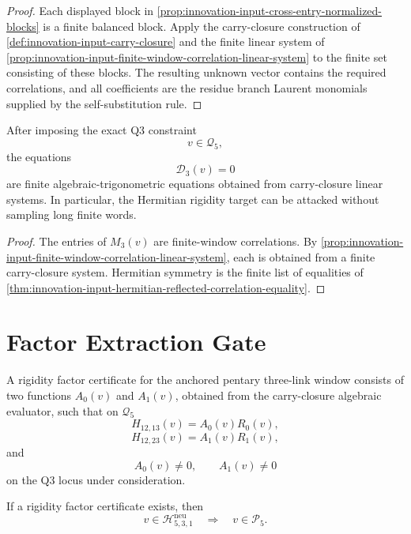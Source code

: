\begin{proof}
Each displayed block in
\autoref{prop:innovation-input-cross-entry-normalized-blocks} is a finite
balanced block. Apply the carry-closure construction of
\autoref{def:innovation-input-carry-closure} and the finite linear system
of
\autoref{prop:innovation-input-finite-window-correlation-linear-system}
to the finite set consisting of these blocks. The resulting unknown vector
contains the required correlations, and all coefficients are the residue
branch Laurent monomials supplied by the self-substitution rule.
\end{proof}

\begin{corollary}
\label{cor:innovation-input-hermitian-locus-explicit}
After imposing the exact Q3 constraint
$$
v\in\mathcal Q_5,
$$
the equations
$$
\mathcal D_3(v)=0
$$
are finite algebraic-trigonometric equations obtained from carry-closure
linear systems. In particular, the Hermitian rigidity target can be
attacked without sampling long finite words.
\end{corollary}

\begin{proof}
The entries of $M_3(v)$ are finite-window correlations. By
\autoref{prop:innovation-input-finite-window-correlation-linear-system},
each is obtained from a finite carry-closure system. Hermitian symmetry is
the finite list of equalities of
\autoref{thm:innovation-input-hermitian-reflected-correlation-equality}.
\end{proof}

\section{Factor Extraction Gate}
\label{sec:innovation-input-factor-extraction-gate}

\begin{definition}
\label{def:innovation-input-rigidity-factor-certificate}
A rigidity factor certificate for the anchored pentary three-link window
consists of two functions $A_0(v)$ and $A_1(v)$, obtained from the
carry-closure algebraic evaluator, such that on $\mathcal Q_5$
$$
H_{12,13}(v)=A_0(v)R_0(v),
$$
$$
H_{12,23}(v)=A_1(v)R_1(v),
$$
and
$$
A_0(v)\ne0,
\qquad
A_1(v)\ne0
$$
on the Q3 locus under consideration.
\end{definition}

\begin{theorem}
\label{thm:innovation-input-factor-certificate-gives-hermitian-rigidity}
If a rigidity factor certificate exists, then
$$
v\in\mathcal H_{5,3,1}^{\mathrm{neu}}
\quad\Longrightarrow\quad
v\in\mathcal P_5.
$$
\end{theorem}


